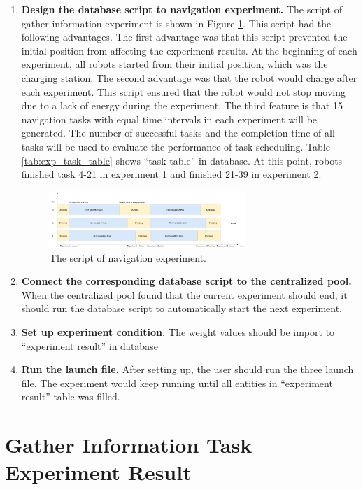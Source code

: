 \begin{enumerate}
 \item \textbf{Design the database script to navigation experiment.} The script of gather information experiment is shown in Figure \ref{fig:nav_exp_timeline}.
 This script had the following advantages. The first advantage was that this script prevented the initial position from affecting the experiment results. At the beginning of each experiment, all robots started from their initial position, which was the charging station. The second advantage was that the robot would charge after each experiment. This script ensured that the robot would not stop moving due to a lack of energy during the experiment. The third feature is that 15 navigation tasks with equal time intervals in each experiment will be generated. The number of successful tasks and the completion time of all tasks will be used to evaluate the performance of task scheduling.
 Table \ref{tab:exp_task_table} shows ``task table'' in database. At this point, robots finished task 4-21 in experiment 1 and finished 21-39 in experiment 2. 
 \begin{figure}[htbp]
    \centering
    \includegraphics[width = 0.7\textwidth]{content/images/ch5/exe_exp_timeline.drawio.png}
    \caption{The script of navigation experiment.}
    \label{fig:nav_exp_timeline}
 \end{figure}
\item \textbf{Connect the corresponding database script to the centralized pool.} When the centralized pool found that the current experiment should end, it should run the database script to automatically start the next experiment.
\item \textbf{Set up experiment condition.} The weight values should be import to ``experiment result'' in database
\item \textbf{Run the launch file.} After setting up, the user should run the three launch file. The experiment would keep running until all entities in ``experiment result'' table was filled.
\end{enumerate}


\section{Gather Information Task Experiment Result}
\label{sec:gather_info_task_experiments}

